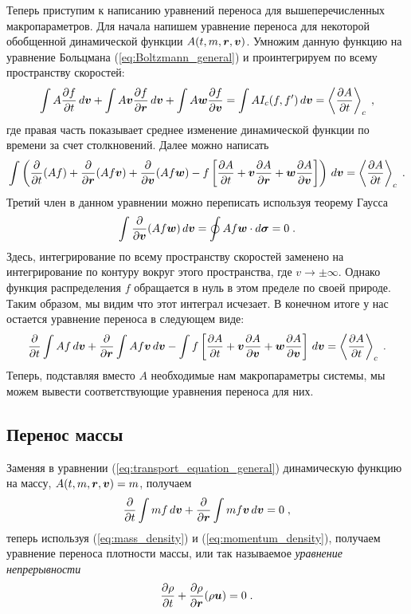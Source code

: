 Теперь приступим к написанию уравнений переноса для вышеперечисленных макропараметров. Для начала напишем
уравнение переноса для некоторой обобщенной динамической функции $A(t,m,\bm{r},\bm{v})$. 
Умножим данную функцию на уравнение Больцмана (\ref{eq:Boltzmann_general})
и проинтегрируем по всему пространству скоростей:
\begin{equation}
  \int A\frac{\partial f}{\partial t}\,d\bm{v} + \int A\bm{v}\frac{\partial f}{\partial\bm{r}}\,d\bm{v}+\int A\bm{w}\frac{\partial f}{\partial\bm{v}} 
  = \int AI_c(f,f')\,d\bm{v} = \left\langle\frac{\partial A}{\partial t}\right\rangle_c\;,
\end{equation}
где правая часть показывает среднее изменение динамической функции по времени за счет столкновений.
Далее можно написать
\begin{equation}
  \int\left(\frac{\partial}{\partial t}(Af)+\frac{\partial}{\partial\bm{r}}(Af\bm{v})+\frac{\partial}{\partial\bm{v}}(Af\bm{w})-
  f\left[\frac{\partial A}{\partial t}+\bm{v}\frac{\partial A}{\partial\bm{r}}+\bm{w}\frac{\partial A}{\partial\bm{v}}\right]\right)
  \,d\bm{v}=\left\langle\frac{\partial A}{\partial t}\right\rangle_c\;.
\end{equation}
Третий член в данном уравнении можно переписать используя теорему Гаусса
 \begin{equation}
   \int\frac{\partial}{\partial\bm{v}}(Af\bm{w})\,d\bm{v}=\oint Af\bm{w}\cdot d\bm{\sigma} = 0\;.
 \end{equation}
Здесь, интегрирование по всему пространству скоростей заменено на интегрирование по контуру вокруг этого пространства, где
$v\to\pm\infty$. Однако функция распределения $f$ обращается в нуль в этом пределе по своей природе. Таким образом,
мы видим что этот интеграл исчезает. В конечном итоге у нас остается уравнение переноса в следующем виде:
\begin{equation}\label{eq:transport_equation_general}
  \frac{\partial}{\partial t}\int Af\,d\bm{v}+\frac{\partial}{\partial\bm{r}}\int Af\bm{v}\,d\bm{v}
  -\int f\left[\frac{\partial A}{\partial t}+\bm{v}\frac{\partial A}{\partial\bm{v}}+\bm{w}\frac{\partial A}{\partial\bm{v}}\right]\,d\bm{v}
  =\left\langle\frac{\partial A}{\partial t}\right\rangle_c\;.
\end{equation}
Теперь, подставляя вместо $A$ необходимые нам макропараметры системы, мы можем вывести соответствующие уравнения переноса для них.

\subsection{Перенос массы}
Заменяя в уравнении (\ref{eq:transport_equation_general}) динамическую функцию на массу, $A(t,m,\bm{r},\bm{v})=m$, получаем
\begin{equation}
  \frac{\partial}{\partial t}\int mf\,d\bm{v} + \frac{\partial}{\partial\bm{r}}\int mf\bm{v}\,d\bm{v} = 0\;,
\end{equation}
теперь используя (\ref{eq:mass_density}) и (\ref{eq:momentum_density}), получаем уравнение переноса плотности массы,
или так называемое \emph{уравнение непрерывности}
\begin{equation}
  \frac{\partial\rho}{\partial t}+\frac{\partial\rho}{\partial\bm{r}}(\rho\bm{u})=0\;.
\end{equation}

